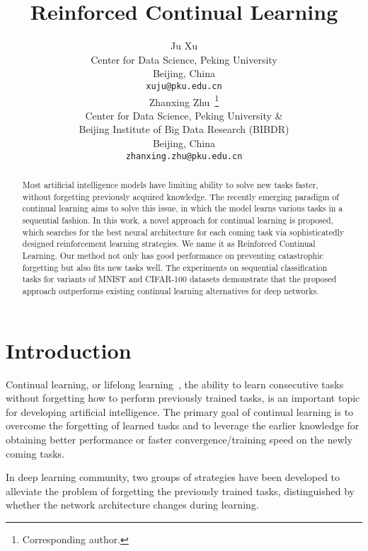 \documentclass{article}
\title{Reinforced Continual Learning}
\author{
  Ju Xu  \\
  Center for Data Science, Peking University\\
  Beijing, China \\
  \texttt{xuju@pku.edu.cn} \\
  \And
   Zhanxing Zhu~\thanks{Corresponding author.}\\
   Center for Data Science, Peking University \& \\
   Beijing Institute of Big Data Research (BIBDR) \\
  Beijing, China \\
  \texttt{zhanxing.zhu@pku.edu.cn} \\
}
\begin{document}

\maketitle
\renewcommand\arraystretch{2}

\begin{abstract}
  Most artificial intelligence models   have  limiting ability to solve new tasks
  faster, without forgetting previously acquired knowledge. The recently emerging paradigm of continual learning aims to solve this issue, in which the model
  learns various tasks in a sequential fashion.
  In this work, a novel approach for continual learning is proposed,  which  searches for the best neural architecture for each coming task via sophisticatedly designed reinforcement learning strategies.  We name it as Reinforced Continual Learning. Our method not only has good performance on preventing catastrophic forgetting but also fits new tasks well.
  The experiments on sequential classification tasks for variants of MNIST and CIFAR-100 datasets demonstrate that the proposed approach outperforms existing continual learning alternatives for deep networks.
\end{abstract}

\section{Introduction}

Continual learning, or lifelong learning~\cite{thrun1}, the ability to learn
consecutive tasks without forgetting how to perform previously
trained tasks, is
an important topic for developing artificial intelligence. The primary goal of continual learning is to overcome the forgetting of learned tasks and to leverage  the earlier knowledge for obtaining better performance or faster convergence/training speed on the newly coming tasks.


In  deep learning community, two groups of strategies have been developed to alleviate the problem of  forgetting the previously trained tasks, distinguished by whether the network architecture changes during learning. 
\end{document}
